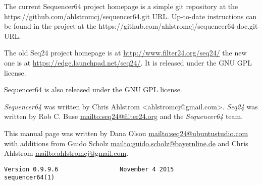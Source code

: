    The current Sequencer64 project homepage is a simple git repository at the
   https://github.com/ahlstromcj/sequencer64.git URL.
   Up-to-date instructions can be found in the project at the
   https://github.com/ahlstromcj/sequencer64-doc.git URL.

   The old Seq24 project homepage is at
   \url{http://www.filter24.org/seq24/} the new
   one is at \url{https://edge.launchpad.net/seq24/}.
   It is released under the GNU GPL license.

   Sequencer64 is also released under the GNU GPL license.

   \textsl{Sequencer64} was written by Chris Ahlstrom <ahlstromcj@gmail.com>.
   \textsl{Seq24} was written by Rob C. Buse \url{mailto:seq24@filter24.org}
   and the \textsl{Sequencer64} team.

   This manual page was written by Dana Olson
   \url{mailto:seq24@ubuntustudio.com} with additions from Guido Scholz
   \url{mailto:guido.scholz@bayernline.de} and Chris Ahlstrom
   \url{mailto:ahlstromcj@gmail.com}.

   \begin{verbatim}
Version 0.9.9.6                 November 4 2015                  sequencer64(1)
   \end{verbatim}

